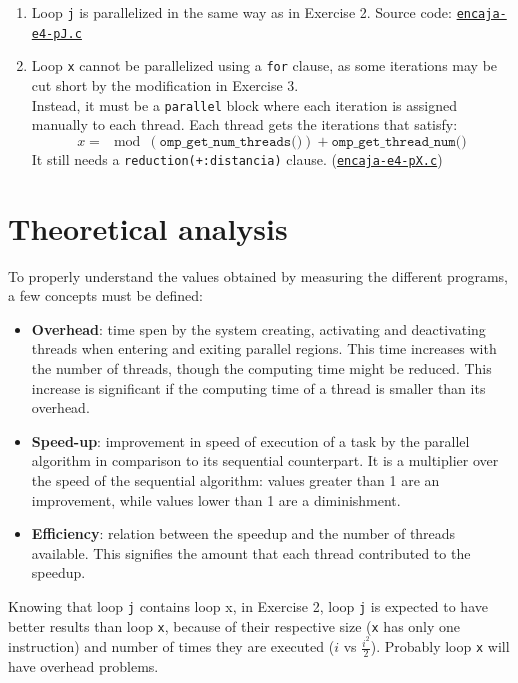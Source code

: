 \documentclass[a4paper]{article}
\newcommand{\github}{https://github.com/kauron/etsinf3/tree/master/CPA/lab2}
\newcommand{\gitline}[2]{\texttt{\href{\github /src/#1#2}{#1}}}
\begin{document}
\begin{enumerate}
\begin{enumerate}
        \item Loop \texttt{j} is parallelized in the same way as in Exercise 2. Source code: \gitline{encaja-e4-pJ.c}{\#L118}
        \item Loop \texttt{x} cannot be parallelized using a \texttt{for} clause, as some iterations may be cut short by the modification in Exercise 3.\\ Instead, it must be a \texttt{parallel} block where each iteration is assigned manually to each thread. Each thread gets the iterations that satisfy: $$x = \mod(\texttt{omp\_get\_num\_threads()}) + \texttt{omp\_get\_thread\_num()}$$ It still needs a \texttt{reduction(+:distancia)} clause. (\gitline{encaja-e4-pX.c}{\#L120})
    \end{enumerate}
\end{enumerate}

\section{Theoretical analysis}
\label{sec:theoretical}
To properly understand the values obtained by measuring the different programs, a few concepts must be defined:
\begin{itemize}
	\item \textbf{Overhead}: time spen by the system creating, activating and deactivating threads when entering and exiting parallel regions. This time increases with the number of threads, though the computing time might be reduced. This increase is significant if the computing time of a thread is smaller than its overhead.
	\item \textbf{Speed-up}: improvement in speed of execution of a task by the parallel algorithm in comparison to its sequential counterpart. It is a multiplier over the speed of the sequential algorithm: values greater than 1 are an improvement, while values lower than 1 are a diminishment.
	\item \textbf{Efficiency}: relation between the speedup and the number of threads available. This signifies the amount that each thread contributed to the speedup.
\end{itemize}

Knowing that loop \texttt{j} contains loop {x}, in Exercise 2, loop \texttt{j} is expected to have better results than loop \texttt{x}, because of their respective size (\texttt{x} has only one instruction) and number of times they are executed ($i$ vs $\frac{i^2}{2}$). Probably loop \texttt{x} will have overhead problems.
\end{document}
